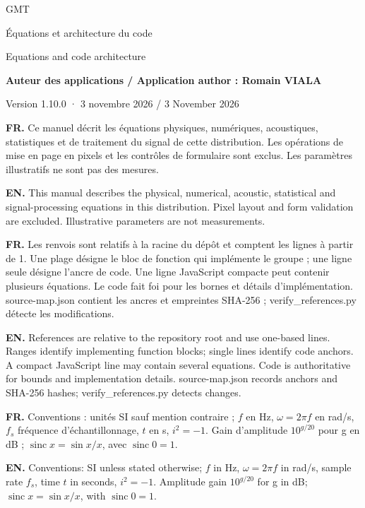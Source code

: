 \documentclass[10pt,a4paper]{article}
\newcommand{\FR}[1]{\textbf{FR.} #1\par}\newcommand{\EN}[1]{{\selectlanguage{english}\textbf{EN.} #1\par}}
\newcommand{\sinc}{\operatorname{sinc}}\newcommand{\clip}{\operatorname{clip}}\newcommand{\diag}{\operatorname{diag}}\newcommand{\Rea}{\operatorname{Re}}\newcommand{\rms}{\operatorname{RMS}}
\begin{document}
{\sffamily\color{ink}\Huge GMT\par}\vspace{3mm}
{\sffamily\Large Équations et architecture du code\par Equations and code architecture\par}\vspace{5mm}
\textbf{Auteur des applications / Application author : Romain VIALA}\par
Version 1.10.0 · 3 novembre 2026 / 3 November 2026\par
\FR{Ce manuel décrit les équations physiques, numériques, acoustiques, statistiques et de traitement du signal de cette distribution. Les opérations de mise en page en pixels et les contrôles de formulaire sont exclus. Les paramètres illustratifs ne sont pas des mesures.}
\EN{This manual describes the physical, numerical, acoustic, statistical and signal-processing equations in this distribution. Pixel layout and form validation are excluded. Illustrative parameters are not measurements.}
\FR{Les renvois sont relatifs à la racine du dépôt et comptent les lignes à partir de 1. Une plage désigne le bloc de fonction qui implémente le groupe ; une ligne seule désigne l’ancre de code. Une ligne JavaScript compacte peut contenir plusieurs équations. Le code fait foi pour les bornes et détails d’implémentation. source-map.json contient les ancres et empreintes SHA-256 ; verify\_references.py détecte les modifications.}
\EN{References are relative to the repository root and use one-based lines. Ranges identify implementing function blocks; single lines identify code anchors. A compact JavaScript line may contain several equations. Code is authoritative for bounds and implementation details. source-map.json records anchors and SHA-256 hashes; verify\_references.py detects changes.}
\FR{Conventions : unités SI sauf mention contraire ; $f$ en Hz, $\omega=2\pi f$ en rad/s, $f_s$ fréquence d’échantillonnage, $t$ en s, $i^2=-1$. Gain d’amplitude $10^{g/20}$ pour g en dB ; $\sinc x=\sin x/x$, avec $\sinc0=1$.}
\EN{Conventions: SI unless stated otherwise; $f$ in Hz, $\omega=2\pi f$ in rad/s, sample rate $f_s$, time $t$ in seconds, $i^2=-1$. Amplitude gain $10^{g/20}$ for g in dB; $\sinc x=\sin x/x$, with $\sinc0=1$.}
\clearpage\tableofcontents\clearpage
\end{document}
